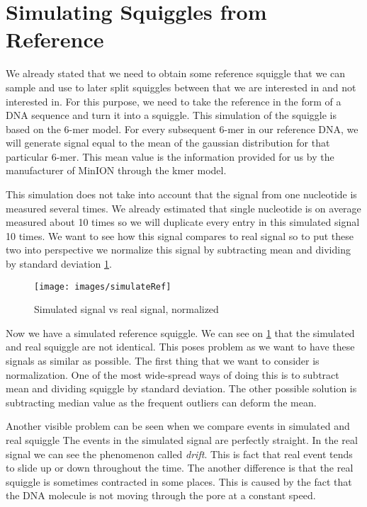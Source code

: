 \section{Simulating Squiggles from Reference}

We already stated that we need to obtain some reference squiggle that we
can sample and use to later split squiggles between that we are interested in and not
interested in. For this purpose, we need to take the reference in the form of a DNA sequence
and turn it into a squiggle. This simulation of the squiggle is based on the 6-mer model.
For every subsequent 6-mer in our reference DNA, we will generate signal equal to
the mean of the gaussian distribution for that particular 6-mer. This mean value
is the information provided for us by the manufacturer of MinION through the kmer model.

This simulation does not take into account that the signal from one nucleotide is
measured several times. We already estimated that single nucleotide is on average
measured about 10 times so we will duplicate every entry in this simulated signal
10 times. We want to see how this signal compares to real signal so to put these
two into perspective we normalize this signal by subtracting mean and dividing by
standard deviation \ref{obr:simVsReal}.

\begin{figure}
\centerline{\texttt{[image: images/simulateRef]}}
\caption[Hehe]{Simulated signal vs real signal, normalized}
\label{obr:simVsReal}
\end{figure}

Now we have a simulated reference squiggle. We can see on \ref{obr:simVsReal} that the simulated and real
squiggle are not identical. This poses problem as we want to have these signals as
similar as possible. The first thing that we want to consider is normalization.
One of the most wide-spread ways of doing this is to subtract mean and dividing
squiggle by standard deviation. The other possible solution is subtracting median value
as the frequent outliers can deform the mean.

Another visible problem can be seen when we compare events in simulated and real squiggle
The events in the simulated signal are perfectly straight. In the real signal we can see
the phenomenon called \textit{drift}. This is fact that real event tends to slide
up or down throughout the time. The another difference is that the real squiggle
is sometimes contracted in some places. This is caused by the fact that the DNA
molecule is not moving through the pore at a constant speed.

